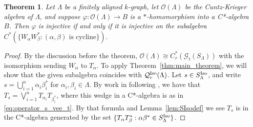 \documentclass[12pt]{amsart}
\newtheorem{thm}{Theorem}[section]
\theoremstyle{definition}
\theoremstyle{remark}
\numberwithin{equation}{section}
\newcommand{\Q}{\mathcal{Q}}
\newcommand{\cO}{\mathcal{O}}
\renewcommand{\L}{\Lambda}
\renewcommand{\a}{\alpha}
\renewcommand{\b}{\beta}
\newcommand{\gt}{\mathcal{G}_{\text{t}}}
\newcommand{\vp}{\varphi}
\newcommand{\Iso}{\textup{Iso}}
\begin{document}
	\begin{thm}\label{thm:k_graph}
		Let $\L$ be a finitely aligned $k$-graph, let $\cO(\L)$ be the Cuntz-Krieger algebra of $\L$, and suppose $\vp:\cO(\L)\to B$ is a $*$-homomorphism into a C*-algebra $B$. Then $\vp$ is injective if and only if it is injective on the subalgebra $C^*(\{W_\a W_\b^*: (\a,\b)\text{ is cycline}\})$. 
	\end{thm}
	
		\begin{proof}
		By the discussion before the theorem, $\cO(\L)\cong C_r^*(\gt(S_\L))$ with the isomorphism sending $W_\a$ to $T_\a$. To apply Theorem~\ref{thm:main_theorem}, we will show that the given subalgebra coincides with $\Q_{r}^\Iso(\L)$. Let $s \in S_\L^\Iso$, and write $s = \bigcup_{i=1}^n\a_i\b_i^*$ for $\a_i, \b_i\in\L$. By work in \cite[Section~3]{DM14} following \cite[Theorem~6.3]{Sp14}, we have that $T_s = \bigvee_{i=1}^nT_{\a_i}T_{\b_i^*}$, where this wedge in a C*-algebra is as in \eqref{eq:operator_s_vee_t}. By that formula and Lemma~\ref{lem:SIsodef} we see $T_s$ is in the C*-algebra generated by the set $\{T_\a T_\b^*: \a\b^*\in S_\L^\Iso\}$. 
	\end{proof}
	

	
	
	
	


	
	




{}
	
\end{document}
